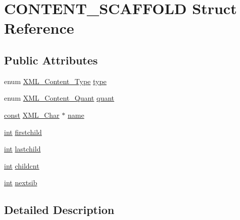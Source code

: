 \hypertarget{struct_c_o_n_t_e_n_t___s_c_a_f_f_o_l_d}{}\section{C\+O\+N\+T\+E\+N\+T\+\_\+\+S\+C\+A\+F\+F\+O\+LD Struct Reference}
\label{struct_c_o_n_t_e_n_t___s_c_a_f_f_o_l_d}
\subsection*{Public Attributes}
\begin{DoxyCompactItemize}
\item 
enum \hyperlink{amiga_2include_2libraries_2expat_8h_abb42ccef87efb634487d28753d14b473}{X\+M\+L\+\_\+\+Content\+\_\+\+Type} \hyperlink{struct_c_o_n_t_e_n_t___s_c_a_f_f_o_l_d_a12a51346c37aaeb549fe45205516de59}{type}
\item 
enum \hyperlink{amiga_2include_2libraries_2expat_8h_a63f73d88e3afb7c5fe7d33bbb193b024}{X\+M\+L\+\_\+\+Content\+\_\+\+Quant} \hyperlink{struct_c_o_n_t_e_n_t___s_c_a_f_f_o_l_d_a0e9c84789f86e2e9f2b123179607cd98}{quant}
\item 
\hyperlink{getopt1_8c_a2c212835823e3c54a8ab6d95c652660e}{const} \hyperlink{amiga_2include_2libraries_2expat_8h_a63da96463e775e1ec3a7d1f076208127}{X\+M\+L\+\_\+\+Char} $\ast$ \hyperlink{struct_c_o_n_t_e_n_t___s_c_a_f_f_o_l_d_a976c830ed4559fd46e92d38abfdc576d}{name}
\item 
\hyperlink{xmltok_8h_a5a0d4a5641ce434f1d23533f2b2e6653}{int} \hyperlink{struct_c_o_n_t_e_n_t___s_c_a_f_f_o_l_d_a4d4dd5cd7f238ea8f49a00388725796d}{firstchild}
\item 
\hyperlink{xmltok_8h_a5a0d4a5641ce434f1d23533f2b2e6653}{int} \hyperlink{struct_c_o_n_t_e_n_t___s_c_a_f_f_o_l_d_a2c79c02feb208f237546fe4ca74b7abe}{lastchild}
\item 
\hyperlink{xmltok_8h_a5a0d4a5641ce434f1d23533f2b2e6653}{int} \hyperlink{struct_c_o_n_t_e_n_t___s_c_a_f_f_o_l_d_af731662d16220f07e1c2c54aa60e3178}{childcnt}
\item 
\hyperlink{xmltok_8h_a5a0d4a5641ce434f1d23533f2b2e6653}{int} \hyperlink{struct_c_o_n_t_e_n_t___s_c_a_f_f_o_l_d_a8958b88b6365b2c44bf651954971b067}{nextsib}
\end{DoxyCompactItemize}


\subsection{Detailed Description}


